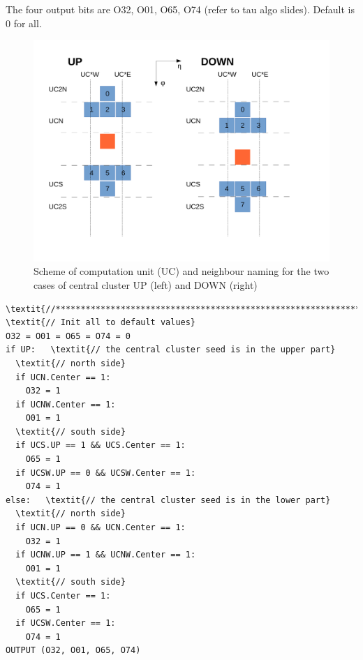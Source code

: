\documentclass[a4paper, 12pt]{article}
\begin{document}
The four output bits are O32, O01, O65, O74 (refer to tau algo slides). Default is 0 for all.

\begin{figure}[hb]
\centering
\includegraphics[scale=0.5]{./tex_images/tauSchemeUC}
\caption{\label{TauMergeNeighSearch_scheme}Scheme of computation unit (UC) and neighbour naming for the two cases of central cluster
UP (left) and DOWN (right)}
\end{figure}

\begin{Verbatim}[label={Tau merging neighbours existence check}]
\textit{//******************************************************************//}
\textit{// Init all to default values}
O32 = O01 = O65 = O74 = 0
if UP:   \textit{// the central cluster seed is in the upper part}
  \textit{// north side}
  if UCN.Center == 1:
    O32 = 1
  if UCNW.Center == 1:
    O01 = 1
  \textit{// south side}
  if UCS.UP == 1 && UCS.Center == 1:
    O65 = 1
  if UCSW.UP == 0 && UCSW.Center == 1: 
    O74 = 1
else:   \textit{// the central cluster seed is in the lower part}
  \textit{// north side}
  if UCN.UP == 0 && UCN.Center == 1:
    O32 = 1
  if UCNW.UP == 1 && UCNW.Center == 1:
    O01 = 1
  \textit{// south side}
  if UCS.Center == 1:
    O65 = 1
  if UCSW.Center == 1:
    O74 = 1
OUTPUT (O32, O01, O65, O74)           
\end{Verbatim}
\end{document}
